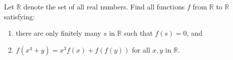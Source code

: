 Let $\mathbb{R}$ denote the set of all real numbers. Find all functions $f$ from $\mathbb{R}$ to $\mathbb{R}$ satisfying:
\begin{enumerate}[label=(\roman*)]
	\item there are only finitely many $s$ in $\mathbb{R}$ such that $f(s)=0$, and
	\item $f(x^4+y)=x^3f(x)+f(f(y))$ for all $x,y$ in $\mathbb{R}$.
\end{enumerate}
